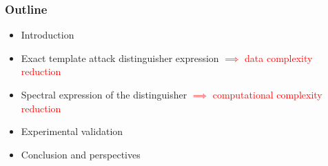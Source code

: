 \documentclass{beamer}
\begin{document}
\begin{frame}

\frametitle{Outline}

\begin{itemize}

\item  Introduction

\pause

\item Exact template attack distinguisher expression \newline
\textcolor{red}{$\implies$ data complexity reduction}
\pause

\item Spectral expression of the distinguisher \newline
\textcolor{red}{$\implies$ computational complexity reduction}
\pause

\item Experimental validation
\pause

\item Conclusion and perspectives

\end{itemize}

\end{frame}



\end{document}
